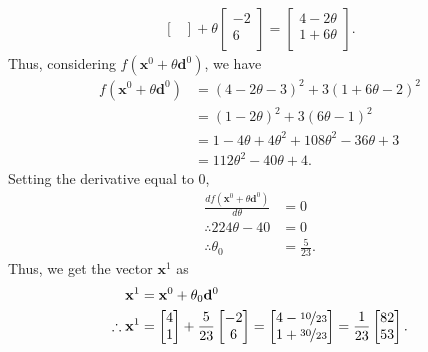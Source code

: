 \documentclass[a4paper,11pt]{article}
\newcommand{\ds}{\displaystyle}
\begin{document}
{{\begin{enumerate}[leftmargin=*]
\begin{enumerate}[label=\alph*)]
\begin{align*}
\begin{bmatrix}
						\end{bmatrix} + \theta
						\begin{bmatrix}
							-2 \\
							6 \\
						\end{bmatrix} =
						\begin{bmatrix}
							4 - 2\theta \\
							1 + 6\theta \\
						\end{bmatrix}.
					\end{align*}
					Thus, considering $\ds{f\left(\mathbf{x}^0 + \theta \mathbf{d}^0\right)}$, we have
					\begin{align*}
						f\left(\mathbf{x}^0 + \theta \mathbf{d}^0\right) & = (4-2\theta-3)^2 + 3(1+6\theta-2)^2 \\
																		 & = (1-2\theta)^2 + 3(6\theta-1)^2 \\
																		 & = 1 - 4\theta + 4\theta^2 + 108\theta^2 - 36\theta + 3 \\
																		 & = 112\theta^2 - 40\theta + 4.
					\end{align*}
					Setting the derivative equal to 0,
					\begin{align*}
						\frac{df\left(\mathbf{x}^0 + \theta \mathbf{d}^0\right)}{d\theta} & = 0 \\
						\therefore 224\theta - 40 & = 0\\
						\therefore \theta_0 & = \frac{5}{23}.
					\end{align*}
					Thus, we get the vector $\ds{\mathbf{x}^1}$ as 
					\begin{align*}
						\mathbf{x}^1 & = \mathbf{x}^0 + \theta_0 \mathbf{d}^0 \\
						\therefore \mathbf{x}^1 & =
						\begin{bmatrix}
							4 \\
							1 \\
						\end{bmatrix} + \frac{5}{23}
						\begin{bmatrix}
							-2 \\
							6 \\
						\end{bmatrix} =
						\begin{bmatrix}
							4 - \nicefrac{10}{23} \\
							1 + \nicefrac{30}{23} \\
						\end{bmatrix} = \frac{1}{23}
						\begin{bmatrix}
							82 \\
							53 \\
						\end{bmatrix}.
					\end{align*}


\end{enumerate}
\end{enumerate}}}
\end{document}

